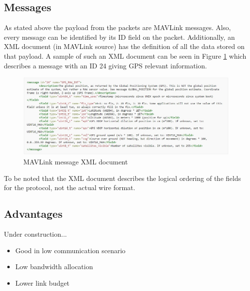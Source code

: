 \subsection{Messages}
As stated above the payload from the packets are MAVLink messages. Also, every message can be identified by its ID field on the packet. Additionally, an XML document (in MAVLink source) has the definition of all the data stored on that payload. A sample of such an XML document can be seen in Figure \ref{fig:mav_msg} which describes a message with an ID 24 giving GPS relevant information.

\begin{figure}[h]
	\centering
	\includegraphics[scale=0.5]{figures/mavlink_msg.jpg}
	\caption{MAVLink message XML document}
	\label{fig:mav_msg}
\end{figure}

To be noted that the XML document describes the logical ordering of the fields for the protocol, not the actual wire format.

\subsection{Advantages}
Under construction...
\begin{itemize}
	\item Good in low communication scenario
	\item Low bandwidth allocation
	\item Lower link budget
\end{itemize}